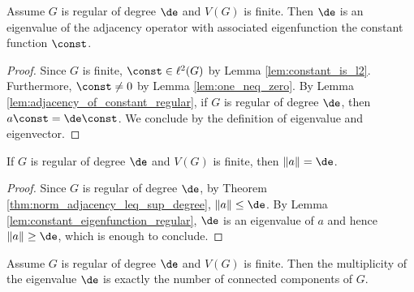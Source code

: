 \begin{lemma}
  \label{lem:constant_eigenfunction_regular}
  Assume $G$ is regular of degree $\de$ and $V(G)$ is finite. Then
  $\de$ is an eigenvalue of the adjacency
  operator with associated eigenfunction the constant function $\const$.
\end{lemma}

\begin{proof}
  Since $G$ is finite, $\const \in \ell^2(G)$ by Lemma \ref{lem:constant_is_l2}.
  Furthermore, $\const \neq 0$ by Lemma \ref{lem:one_neq_zero}.
  By Lemma \ref{lem:adjacency_of_constant_regular}, if $G$ is regular of degree $\de$,
  then $a \const = \de \const$.  We conclude by the definition of eigenvalue and eigenvector.
\end{proof}

\begin{proposition}
  \label{prop:norm_adjacency_regular}
  If $G$ is regular of degree $\de$ and $V(G)$ is finite, then $\|a\|=\de$.
\end{proposition}

\begin{proof}
  Since $G$ is regular of degree $\de$, by
  Theorem \ref{thm:norm_adjacency_leq_sup_degree}, $\|a \| \leq \de$.
  By Lemma \ref{lem:constant_eigenfunction_regular}, $\de$ is an eigenvalue of $a$
  and hence $\|a\| \geq \de$,
  which is enough to conclude.
\end{proof}

\begin{proposition}
  \label{prop:regular_multiplicity_trivial_eigenvalue}
  Assume $G$ is regular of degree $\de$ and $V(G)$ is finite.
  Then the multiplicity of the
  eigenvalue $\de$ is exactly the number of connected components of $G$.
\end{proposition}

